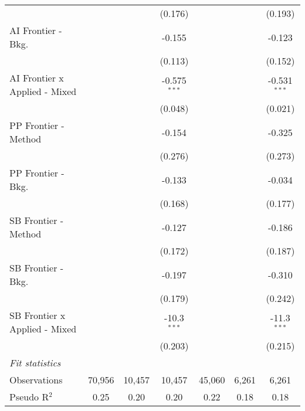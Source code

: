 \begin{tabular}{lcccccc}
                                 &               &               & (0.176)        &               &               & (0.193)\\   
   AI Frontier - Bkg.            &               &               & -0.155         &               &               & -0.123\\   
                                 &               &               & (0.113)        &               &               & (0.152)\\   
   AI Frontier x Applied - Mixed &               &               & -0.575$^{***}$ &               &               & -0.531$^{***}$\\   
                                 &               &               & (0.048)        &               &               & (0.021)\\   
   PP Frontier - Method          &               &               & -0.154         &               &               & -0.325\\   
                                 &               &               & (0.276)        &               &               & (0.273)\\   
   PP Frontier - Bkg.            &               &               & -0.133         &               &               & -0.034\\   
                                 &               &               & (0.168)        &               &               & (0.177)\\   
   SB Frontier - Method          &               &               & -0.127         &               &               & -0.186\\   
                                 &               &               & (0.172)        &               &               & (0.187)\\   
   SB Frontier - Bkg.            &               &               & -0.197         &               &               & -0.310\\   
                                 &               &               & (0.179)        &               &               & (0.242)\\   
   SB Frontier x Applied - Mixed &               &               & -10.3$^{***}$  &               &               & -11.3$^{***}$\\   
                                 &               &               & (0.203)        &               &               & (0.215)\\   
   \midrule
   \emph{Fit statistics}\\
   Observations                  & 70,956        & 10,457        & 10,457         & 45,060        & 6,261         & 6,261\\  
   Pseudo R$^2$                  & 0.25          & 0.20          & 0.20           & 0.22          & 0.18          & 0.18\\  
   

\end{tabular}
